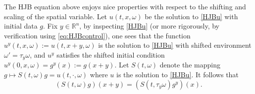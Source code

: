 \documentclass[11pt,reqno]{amsart}
\theoremstyle{definition}
\theoremstyle{remark}
\numberwithin{equation}{section}
\newcommand{\R}{{\mathbb{R}}}
\begin{document}
The HJB equation above enjoys nice properties with respect to the shifting and scaling of the spatial variable. Let $u(t,x,\omega)$ be the solution to \eqref{HJBu} with initial data $g$. Fix $y\in \R^n$, by inspecting \eqref{HJBu} (or more rigorously, by verification using \eqref{eq:HJBcontrol}), one sees that the function $u^y(t,x,\omega) :=  u(t,x+y,\omega)$ is the solution to \eqref{HJBu} with shifted environment $\omega'=\tau_y\omega$, and $u^y$ satisfies the shifted initial condition $u^y(0,x,\omega) = g^y(x) := g(x+y)$. %
Let $S(t,\omega)$ denote the mapping $g\mapsto S(t,\omega)g = u(t,\cdot,\omega)$ where $u$ is the solution to \eqref{HJBu}. It follows that
\begin{equation}\label{Trans}
    \left(S(t,\omega)g\right)(x+y) = \left(S(t,\tau_y \omega)g^y\right)(x).
\end{equation}
\end{document}
